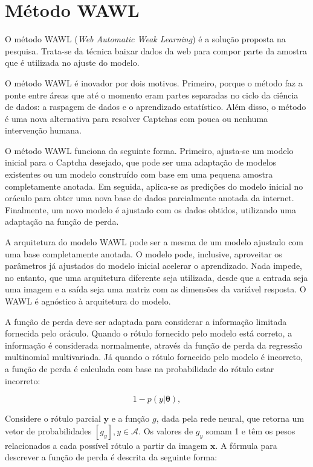 \documentclass[12pt,twoside,brazilian]{book}
\begin{document}
\hypertarget{sec-wawl}{%
\section{Método WAWL}\label{sec-wawl}}

O método WAWL (\emph{Web Automatic Weak Learning}) é a solução proposta
na pesquisa. Trata-se da técnica baixar dados da web para compor parte
da amostra que é utilizada no ajuste do modelo.

O método WAWL é inovador por dois motivos. Primeiro, porque o método faz
a ponte entre áreas que até o momento eram partes separadas no ciclo da
ciência de dados: a raspagem de dados e o aprendizado estatístico. Além
disso, o método é uma nova alternativa para resolver Captchas com pouca
ou nenhuma intervenção humana.

O método WAWL funciona da seguinte forma. Primeiro, ajusta-se um modelo
inicial para o Captcha desejado, que pode ser uma adaptação de modelos
existentes ou um modelo construído com base em uma pequena amostra
completamente anotada. Em seguida, aplica-se as predições do modelo
inicial no oráculo para obter uma nova base de dados parcialmente
anotada da internet. Finalmente, um novo modelo é ajustado com os dados
obtidos, utilizando uma adaptação na função de perda.

A arquitetura do modelo WAWL pode ser a mesma de um modelo ajustado com
uma base completamente anotada. O modelo pode, inclusive, aproveitar os
parâmetros já ajustados do modelo inicial acelerar o aprendizado. Nada
impede, no entanto, que uma arquitetura diferente seja utilizada, desde
que a entrada seja uma imagem e a saída seja uma matriz com as dimensões
da variável resposta. O WAWL é agnóstico à arquitetura do modelo.

A função de perda deve ser adaptada para considerar a informação
limitada fornecida pelo oráculo. Quando o rótulo fornecido pelo modelo
está correto, a informação é considerada normalmente, através da função
de perda da regressão multinomial multivariada. Já quando o rótulo
fornecido pelo modelo é incorreto, a função de perda é calculada com
base na probabilidade do rótulo estar incorreto:

\[
1 - p(y|\boldsymbol \theta),
\]

Considere o rótulo parcial \({\mathbf y}\) e a função \(g\), dada pela
rede neural, que retorna um vetor de probabilidades
\([g_y], y \in \mathcal A\). Os valores de \(g_y\) somam 1 e têm os
pesos relacionados a cada possível rótulo a partir da imagem
\(\mathbf x\). A fórmula para descrever a função de perda é descrita da
seguinte forma:
\end{document}
